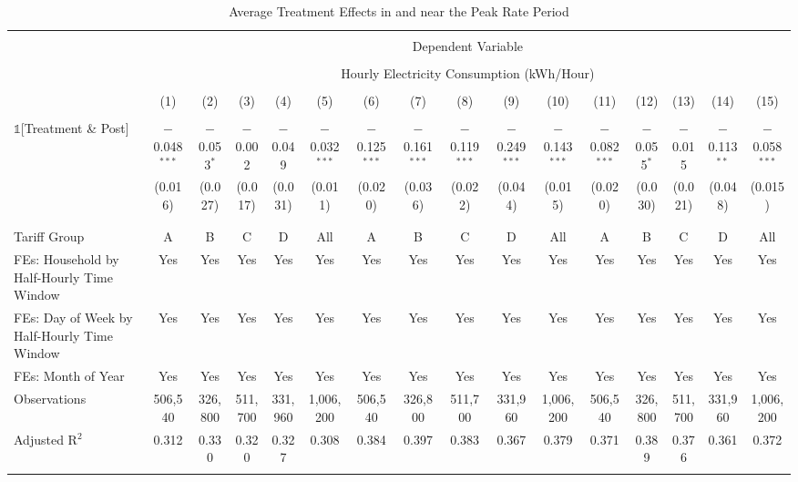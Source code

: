 
\begin{table}[!htbp] \centering 
  \caption{Average Treatment Effects in and near the Peak Rate Period} 
  \label{Table:Average-Treatment-Effects-in-and-near-the-Peak-Rate-Period} 
\small 
\begin{tabular}{@{\extracolsep{20pt}}lccccccccccccccc} 
\\[-1.8ex]\hline 
\hline \\[-1.8ex] 
 & \multicolumn{15}{c}{Dependent Variable} \\ 
\cline{2-16} 
\\[-1.8ex] & \multicolumn{15}{c}{Hourly Electricity Consumption  (kWh/Hour)} \\ 
\\[-1.8ex] & (1) & (2) & (3) & (4) & (5) & (6) & (7) & (8) & (9) & (10) & (11) & (12) & (13) & (14) & (15)\\ 
\hline \\[-1.8ex] 
 $\mathbb{1}$[Treatment \& Post] & $-$0.048$^{***}$ & $-$0.053$^{*}$ & $-$0.002 & $-$0.049 & $-$0.032$^{***}$ & $-$0.125$^{***}$ & $-$0.161$^{***}$ & $-$0.119$^{***}$ & $-$0.249$^{***}$ & $-$0.143$^{***}$ & $-$0.082$^{***}$ & $-$0.055$^{*}$ & $-$0.015 & $-$0.113$^{**}$ & $-$0.058$^{***}$ \\ 
  & (0.016) & (0.027) & (0.017) & (0.031) & (0.011) & (0.020) & (0.036) & (0.022) & (0.044) & (0.015) & (0.020) & (0.030) & (0.021) & (0.048) & (0.015) \\ 
  & & & & & & & & & & & & & & & \\ 
\hline \\[-1.8ex] 
Tariff Group & A & B & C & D & All & A & B & C & D & All & A & B & C & D & All \\ 
FEs: Household by Half-Hourly Time Window & Yes & Yes & Yes & Yes & Yes & Yes & Yes & Yes & Yes & Yes & Yes & Yes & Yes & Yes & Yes \\ 
FEs: Day of Week by Half-Hourly Time Window & Yes & Yes & Yes & Yes & Yes & Yes & Yes & Yes & Yes & Yes & Yes & Yes & Yes & Yes & Yes \\ 
FEs: Month of Year & Yes & Yes & Yes & Yes & Yes & Yes & Yes & Yes & Yes & Yes & Yes & Yes & Yes & Yes & Yes \\ 
Observations & 506,540 & 326,800 & 511,700 & 331,960 & 1,006,200 & 506,540 & 326,800 & 511,700 & 331,960 & 1,006,200 & 506,540 & 326,800 & 511,700 & 331,960 & 1,006,200 \\ 
Adjusted R$^{2}$ & 0.312 & 0.330 & 0.320 & 0.327 & 0.308 & 0.384 & 0.397 & 0.383 & 0.367 & 0.379 & 0.371 & 0.389 & 0.376 & 0.361 & 0.372 \\ 
\hline 
\hline \\[-1.8ex] 
\end{tabular} 
\end{table} 
